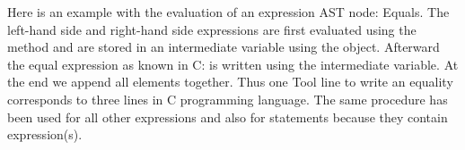 Here is an example with the evaluation of an expression AST node: Equals.
The left-hand side and right-hand side expressions are first evaluated using the  method and
are stored in an intermediate variable using the  object.
Afterward the equal expression as known in C:  is written using the intermediate variable.
At the end we append all elements together. Thus one Tool line to write an equality corresponds to
three lines in C programming language.
\newline
The same procedure has been used for all other expressions and also for statements
because they contain expression(s).
\newline
